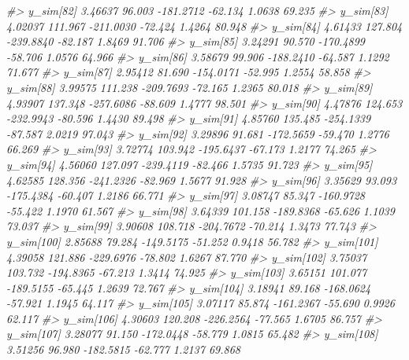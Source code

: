 \documentclass[
  10pt,
  italian,
  a4paper,
  extrafontsizes,onecolumn,openright
  ]{memoir}
\newenvironment{Shaded}{\begin{snugshade}}{\end{snugshade}}
\newcommand{\CommentTok}[1]{\textcolor[rgb]{0.56,0.35,0.01}{\textit{#1}}}
\begin{document}
\begin{Shaded}
\begin{Highlighting}[]
\CommentTok{\#\textgreater{}   y\_sim[82]   3.46637  96.003 {-}181.2712 {-}62.134  1.0638  69.235}
\CommentTok{\#\textgreater{}   y\_sim[83]   4.02037 111.967 {-}211.0030 {-}72.424  1.4264  80.948}
\CommentTok{\#\textgreater{}   y\_sim[84]   4.61433 127.804 {-}239.8840 {-}82.187  1.8469  91.706}
\CommentTok{\#\textgreater{}   y\_sim[85]   3.24291  90.570 {-}170.4899 {-}58.706  1.0576  64.966}
\CommentTok{\#\textgreater{}   y\_sim[86]   3.58679  99.906 {-}188.2410 {-}64.587  1.1292  71.677}
\CommentTok{\#\textgreater{}   y\_sim[87]   2.95412  81.690 {-}154.0171 {-}52.995  1.2554  58.858}
\CommentTok{\#\textgreater{}   y\_sim[88]   3.99575 111.238 {-}209.7693 {-}72.165  1.2365  80.018}
\CommentTok{\#\textgreater{}   y\_sim[89]   4.93907 137.348 {-}257.6086 {-}88.609  1.4777  98.501}
\CommentTok{\#\textgreater{}   y\_sim[90]   4.47876 124.653 {-}232.9943 {-}80.596  1.4430  89.498}
\CommentTok{\#\textgreater{}   y\_sim[91]   4.85760 135.485 {-}254.1339 {-}87.587  2.0219  97.043}
\CommentTok{\#\textgreater{}   y\_sim[92]   3.29896  91.681 {-}172.5659 {-}59.470  1.2776  66.269}
\CommentTok{\#\textgreater{}   y\_sim[93]   3.72774 103.942 {-}195.6437 {-}67.173  1.2177  74.265}
\CommentTok{\#\textgreater{}   y\_sim[94]   4.56060 127.097 {-}239.4119 {-}82.466  1.5735  91.723}
\CommentTok{\#\textgreater{}   y\_sim[95]   4.62585 128.356 {-}241.2326 {-}82.969  1.5677  91.928}
\CommentTok{\#\textgreater{}   y\_sim[96]   3.35629  93.093 {-}175.4384 {-}60.407  1.2186  66.771}
\CommentTok{\#\textgreater{}   y\_sim[97]   3.08747  85.347 {-}160.9728 {-}55.422  1.1970  61.567}
\CommentTok{\#\textgreater{}   y\_sim[98]   3.64339 101.158 {-}189.8368 {-}65.626  1.1039  73.037}
\CommentTok{\#\textgreater{}   y\_sim[99]   3.90608 108.718 {-}204.7672 {-}70.214  1.3473  77.743}
\CommentTok{\#\textgreater{}   y\_sim[100]  2.85688  79.284 {-}149.5175 {-}51.252  0.9418  56.782}
\CommentTok{\#\textgreater{}   y\_sim[101]  4.39058 121.886 {-}229.6976 {-}78.802  1.6267  87.770}
\CommentTok{\#\textgreater{}   y\_sim[102]  3.75037 103.732 {-}194.8365 {-}67.213  1.3414  74.925}
\CommentTok{\#\textgreater{}   y\_sim[103]  3.65151 101.077 {-}189.5155 {-}65.445  1.2639  72.767}
\CommentTok{\#\textgreater{}   y\_sim[104]  3.18941  89.168 {-}168.0624 {-}57.921  1.1945  64.117}
\CommentTok{\#\textgreater{}   y\_sim[105]  3.07117  85.874 {-}161.2367 {-}55.690  0.9926  62.117}
\CommentTok{\#\textgreater{}   y\_sim[106]  4.30603 120.208 {-}226.2564 {-}77.565  1.6705  86.757}
\CommentTok{\#\textgreater{}   y\_sim[107]  3.28077  91.150 {-}172.0448 {-}58.779  1.0815  65.482}
\CommentTok{\#\textgreater{}   y\_sim[108]  3.51256  96.980 {-}182.5815 {-}62.777  1.2137  69.868}

\end{Highlighting}
\end{Shaded}
\end{document}
